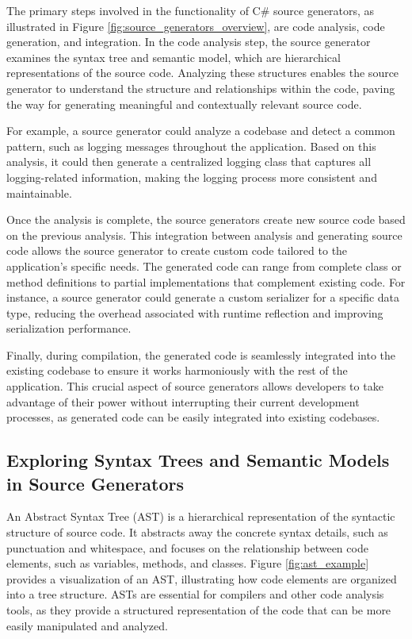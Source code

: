 The primary steps involved in the functionality of C\# source generators, as illustrated in Figure \ref{fig:source_generators_overview}, are code analysis, code generation, and integration. In the code analysis step, the source generator examines the syntax tree and semantic model, which are hierarchical representations of the source code. Analyzing these structures enables the source generator to understand the structure and relationships within the code, paving the way for generating meaningful and contextually relevant source code.

For example, a source generator could analyze a codebase and detect a common pattern, such as logging messages throughout the application. Based on this analysis, it could then generate a centralized logging class that captures all logging-related information, making the logging process more consistent and maintainable.

Once the analysis is complete, the source generators create new source code based on the previous analysis. This integration between analysis and generating source code allows the source generator to create custom code tailored to the application's specific needs. The generated code can range from complete class or method definitions to partial implementations that complement existing code. For instance, a source generator could generate a custom serializer for a specific data type, reducing the overhead associated with runtime reflection and improving serialization performance.

Finally, during compilation, the generated code is seamlessly integrated into the existing codebase to ensure it works harmoniously with the rest of the application. This crucial aspect of source generators allows developers to take advantage of their power without interrupting their current development processes, as generated code can be easily integrated into existing codebases.

\subsection{Exploring Syntax Trees and Semantic Models in Source Generators}

An Abstract Syntax Tree (AST) is a hierarchical representation of the syntactic structure of source code. It abstracts away the concrete syntax details, such as punctuation and whitespace, and focuses on the relationship between code elements, such as variables, methods, and classes. Figure \ref{fig:ast_example} provides a visualization of an AST, illustrating how code elements are organized into a tree structure. ASTs are essential for compilers and other code analysis tools, as they provide a structured representation of the code that can be more easily manipulated and analyzed.

